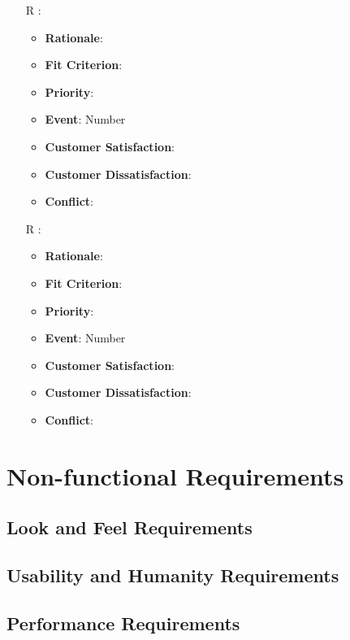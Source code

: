 \documentclass[12pt, titlepage]{article}
\newcounter{reqnum} %
\begin{document}
\begin{itemize}
\item[R\refstepcounter{reqnum}\thereqnum
\label{R_Inputs_1}:] 
\begin{itemize}
    \item \textbf{Rationale}:
    \item \textbf{Fit Criterion}:
    \item \textbf{Priority}:
    \item \textbf{Event}: Number
    \item \textbf{Customer Satisfaction}:
    \item \textbf{Customer Dissatisfaction}:
    \item \textbf{Conflict}:
\end{itemize}

\item[R\refstepcounter{reqnum}\thereqnum
\label{R_Inputs_1}:] 
\begin{itemize}
    \item \textbf{Rationale}:
    \item \textbf{Fit Criterion}:
    \item \textbf{Priority}:
    \item \textbf{Event}: Number
    \item \textbf{Customer Satisfaction}:
    \item \textbf{Customer Dissatisfaction}:
    \item \textbf{Conflict}:
\end{itemize}


\end{itemize}

\section{Non-functional Requirements}

\subsection{Look and Feel Requirements}

\subsection{Usability and Humanity Requirements}

\subsection{Performance Requirements}
\end{document}
